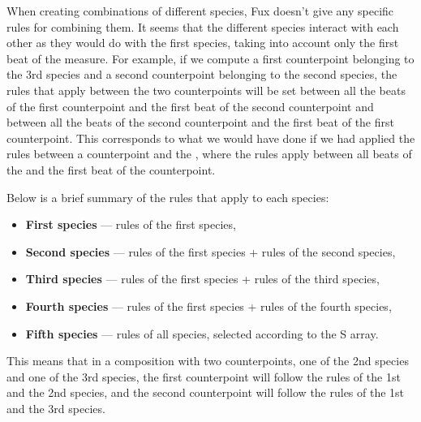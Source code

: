 When creating combinations of different species, Fux doesn't give any specific rules for combining them. It seems that the different species interact with each other as they would do with the first species, taking into account only the first beat of the measure. For example, if we compute a first counterpoint belonging to the 3rd species and a second counterpoint belonging to the second species, the rules that apply between the two counterpoints will be set between all the beats of the first counterpoint and the first beat of the second counterpoint and between all the beats of the second counterpoint and the first beat of the first counterpoint. This corresponds to what we would have done if we had applied the rules between a counterpoint and the \cf, where the rules apply between all beats of the \cfs and the first beat of the counterpoint.

Below is a brief summary of the rules that apply to each species:
\begin{itemize}
    \item \textbf{First species} --- rules of the first species,
    \item \textbf{Second species} --- rules of the first species + rules of the second species,
    \item \textbf{Third species} --- rules of the first species + rules of the third species,
    \item \textbf{Fourth species} --- rules of the first species + rules of the fourth species,
    \item \textbf{Fifth species} --- rules of all species, selected according to the S array.
\end{itemize}
This means that in a composition with two counterpoints, one of the 2nd species and one of the 3rd species, the first counterpoint will follow the rules of the 1st and the 2nd species, and the second counterpoint will follow the rules of the 1st and the 3rd species.